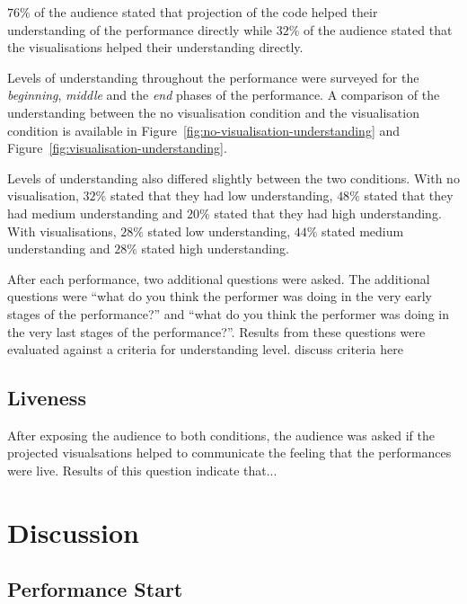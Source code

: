 $76\%$ of the audience stated that projection of the code helped their understanding of the performance directly while $32\%$ of the audience stated that the visualisations helped their understanding directly.

Levels of understanding throughout the performance were surveyed for the \emph{beginning}, \emph{middle} and the \emph{end} phases of the performance. A comparison of the understanding between the no visualisation condition and the visualisation condition is available in Figure~\ref{fig:no-visualisation-understanding} and Figure~\ref{fig:visualisation-understanding}.

Levels of understanding also differed slightly between the two conditions. With no visualisation, $32\%$ stated that they had low understanding, $48\%$ stated that they had medium understanding and $20\%$ stated that they had high understanding. With visualisations, $28\%$ stated low understanding, $44\%$ stated medium understanding and $28\%$ stated high understanding.

After each performance, two additional questions were asked. The additional questions were ``what do you think the performer was doing in the very early stages of the performance?'' and ``what do you think the performer was doing in the very last stages of the performance?''. Results from these questions were evaluated against a criteria for understanding level. {\color{red} discuss criteria here}

\subsection{Liveness}

After exposing the audience to both conditions, the audience was asked if the projected visualsations helped to communicate the feeling that the performances were live. Results of this question indicate that...

\more

\section{Discussion}



\subsection{Performance Start}


